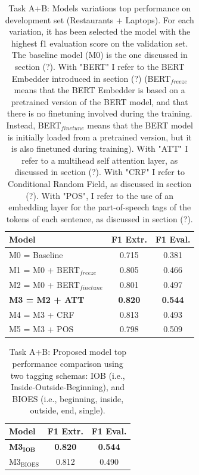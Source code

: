 \documentclass[11pt,a4paper]{article}
\begin{document}
	
	\begin{table}[H]
		\centering
		\begin{tabular}{@{}lcc@{}}
			\toprule
			\textbf{Model}         & F1 Extr.       & F1 Eval.       \\ \midrule
			M0 = Baseline          & 0.715          & 0.381          \\
			M1 = M0 + BERT$_{freeze}$         & 0.805          & 0.466          \\
			M2 = M0 + BERT$_{finetune}$        & 0.801          & 0.497          \\
			\textbf{M3 = M2 + ATT} & \textbf{0.820} & \textbf{0.544} \\
			\midrule
			M4 = M3 + CRF          & 0.813          & 0.493          \\
			M5 = M3 + POS          & 0.798          & 0.509          \\ \bottomrule
		\end{tabular}
		\caption{Task A+B: Models variations top performance on development set
			(Restaurants + Laptops). For each variation, it has been selected the model with
			the highest f1 evaluation score on the validation set. \\ The baseline model
			(M0) is the one discussed in section (?). With "BERT" I refer to the BERT
			Embedder introduced in section (?) (BERT$_{freeze}$ means that the BERT Embedder
			is based on a pretrained version of the BERT model, and that there is no
			finetuning involved during the training. Instead, BERT$_{finetune}$ means that
			the BERT model is initially loaded from a pretrained version, but it is also
			finetuned during training). With "ATT" I refer to a multihead self attention
			layer, as discussed in section (?). With "CRF" I refer to Conditional Random
			Field, as discussed in section (?). With "POS", I refer to the use of an
			embedding layer for the part-of-speech tags of the tokens of each sentence, as
			discussed in section (?).}
		\label{tab:ab_ablation}
	\end{table}
	
	\begin{table}[H]
		\centering
		\begin{tabular}{@{}lcc@{}}
			\toprule
			\textbf{Model}                        & F1 Extr.       & F1 Eval.       \\
			\midrule
			\textbf{M3$_{\mathbf{IOB}}$} & \textbf{0.820} & \textbf{0.544} \\
			M3$_{\mathrm{BIOES}}$                         & 0.812          & 0.490       
			\\ \bottomrule
		\end{tabular}
		\caption{Task A+B: Proposed model top performance comparison using two tagging
			schemas: IOB (i.e., Inside-Outside-Beginning), and BIOES (i.e., beginning,
			inside, outside, end, single).}
		\label{tab:ab_iob_bioes}
	\end{table}
	
\end{document}
